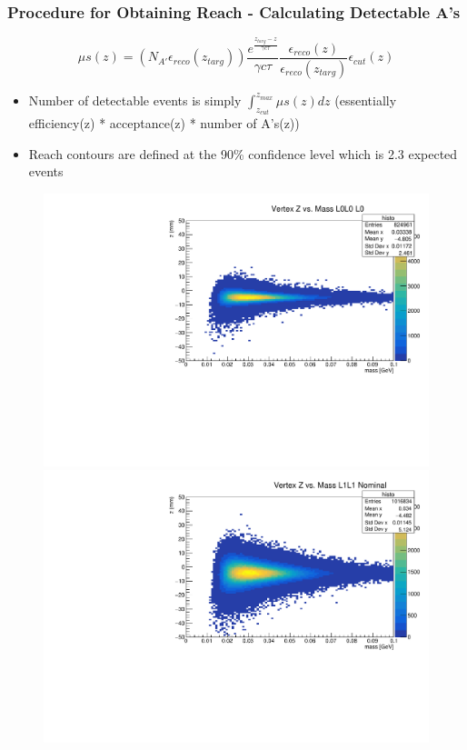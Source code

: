 \documentclass{beamer}
\begin{document}
\begin{frame}
\frametitle{Procedure for Obtaining Reach - Calculating Detectable A's}
\begin{equation}
\mu s(z) = (N_{A'} \epsilon_{reco} (z_{targ})) \frac{e^{\frac{z_{targ}-z}{\gamma c \tau}}}{\gamma c \tau} \frac{\epsilon_{reco}(z)}{\epsilon_{reco}(z_{targ})} \epsilon_{cut}(z)
\end{equation}
\begin{itemize}
\item Number of detectable events is simply $\int_{z_{cut}}^{z_{max}} \mu s(z) dz$ (essentially efficiency(z) * acceptance(z) * number of A's(z))
\item Reach contours are defined at the 90\% confidence level which is 2.3 expected events
\end{itemize}
\begin{figure}
\includegraphics[width=0.3\linewidth]{figs/L0L0_loose.pdf}
\includegraphics[width=0.3\linewidth]{figs/L1L1_loose_nom.pdf}
\end{figure}

\end{frame}

\end{document}
